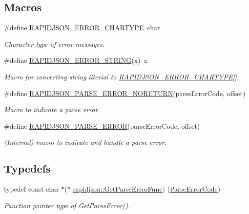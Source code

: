 \subsection*{Macros}
\begin{DoxyCompactItemize}
\item 
\#define \mbox{\hyperlink{group___r_a_p_i_d_j_s_o_n___e_r_r_o_r_s_ga7e4636fd48d0148f102b8a13f0539d8c}{R\+A\+P\+I\+D\+J\+S\+O\+N\+\_\+\+E\+R\+R\+O\+R\+\_\+\+C\+H\+A\+R\+T\+Y\+PE}}~char
\begin{DoxyCompactList}\small\item\em Character type of error messages. \end{DoxyCompactList}\item 
\#define \mbox{\hyperlink{group___r_a_p_i_d_j_s_o_n___e_r_r_o_r_s_gabe2e1bd1349e5a7d6c1af78c05a98f0d}{R\+A\+P\+I\+D\+J\+S\+O\+N\+\_\+\+E\+R\+R\+O\+R\+\_\+\+S\+T\+R\+I\+NG}}(x)~x
\begin{DoxyCompactList}\small\item\em Macro for converting string literial to \mbox{\hyperlink{group___r_a_p_i_d_j_s_o_n___e_r_r_o_r_s_ga7e4636fd48d0148f102b8a13f0539d8c}{R\+A\+P\+I\+D\+J\+S\+O\+N\+\_\+\+E\+R\+R\+O\+R\+\_\+\+C\+H\+A\+R\+T\+Y\+PE}}\mbox{[}\mbox{]}. \end{DoxyCompactList}\item 
\#define \mbox{\hyperlink{group___r_a_p_i_d_j_s_o_n___e_r_r_o_r_s_ga7f8c4265b2edda78568ae3338aaf1461}{R\+A\+P\+I\+D\+J\+S\+O\+N\+\_\+\+P\+A\+R\+S\+E\+\_\+\+E\+R\+R\+O\+R\+\_\+\+N\+O\+R\+E\+T\+U\+RN}}(parse\+Error\+Code,  offset)
\begin{DoxyCompactList}\small\item\em Macro to indicate a parse error. \end{DoxyCompactList}\item 
\#define \mbox{\hyperlink{group___r_a_p_i_d_j_s_o_n___e_r_r_o_r_s_gae3689840fa6e89a241313f33b602f865}{R\+A\+P\+I\+D\+J\+S\+O\+N\+\_\+\+P\+A\+R\+S\+E\+\_\+\+E\+R\+R\+OR}}(parse\+Error\+Code,  offset)
\begin{DoxyCompactList}\small\item\em (Internal) macro to indicate and handle a parse error. \end{DoxyCompactList}\end{DoxyCompactItemize}
\subsection*{Typedefs}
\begin{DoxyCompactItemize}
\item 
typedef const char $\ast$($\ast$ \mbox{\hyperlink{group___r_a_p_i_d_j_s_o_n___e_r_r_o_r_s_gafde34fb0f573d1b551b566cc03e294fb}{rapidjson\+::\+Get\+Parse\+Error\+Func}}) (\mbox{\hyperlink{group___r_a_p_i_d_j_s_o_n___e_r_r_o_r_s_ga7d3acf640886b1f2552dc8c4cd6dea60}{Parse\+Error\+Code}})
\begin{DoxyCompactList}\small\item\em Function pointer type of Get\+Parse\+Error(). \end{DoxyCompactList}\end{DoxyCompactItemize}
